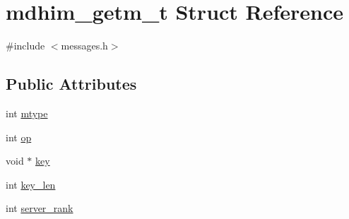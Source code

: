 \hypertarget{structmdhim__getm__t}{\section{mdhim\-\_\-getm\-\_\-t Struct Reference}
\label{d9/d54/structmdhim__getm__t}
}


{\ttfamily \#include $<$messages.\-h$>$}

\subsection*{Public Attributes}
\begin{DoxyCompactItemize}
\item 
int \hyperlink{structmdhim__getm__t_a803aef9942bd6bd39d10c22f4f1205d3}{mtype}
\item 
int \hyperlink{structmdhim__getm__t_a81dd92f402e433928b8b3bae7ccdefd8}{op}
\item 
void $\ast$ \hyperlink{structmdhim__getm__t_a53c3aff6037a3e693e09ff4e98bd7eba}{key}
\item 
int \hyperlink{structmdhim__getm__t_a8942a21db02e749c3f3b04b32fea795e}{key\-\_\-len}
\item 
int \hyperlink{structmdhim__getm__t_a2fe10e46b27b008657d3c59299ea1fd6}{server\-\_\-rank}
\end{DoxyCompactItemize}


